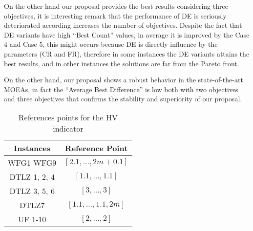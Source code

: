 On the other hand our proposal provides the best results considering three objectives, it is interesting remark that the performance of DE is seriously deteriorated according increases the number of objectives. 
%
Despite the fact that DE variants have high ``Best Count'' values, in average it is improved by the Case 4 and Case 5, this might occurs because DE is directly influence by the parameters (CR and FR), therefore in some instances the DE variants attains the best results, and in other instances the solutions are far from the Pareto front.
%

On the other hand, our proposal shows a robust behavior in the state-of-the-art MOEAs, in fact the ``Average Best Difference'' is low both with two objectives and three objectives that confirms the stability and superiority of our proposal.
%
\begin{table}[t]
\centering
\scriptsize
\caption{References points for the HV indicator}
\label{tab:ReferencePoints}
\begin{tabular}{cc}
\hline
\textbf{Instances} & \textbf{Reference Point} \\ \hline
WFG1-WFG9 & $[2.1, ...,2m+0.1]$ \\
DTLZ 1, 2, 4 & $[1.1, ..., 1.1]$ \\
DTLZ 3, 5, 6 & $[3, ..., 3]$ \\
DTLZ7 & $[1.1, ..., 1.1, 2m]$ \\
UF 1-10 & $[2, ..., 2]$ \\ \hline
\end{tabular}
\end{table}
